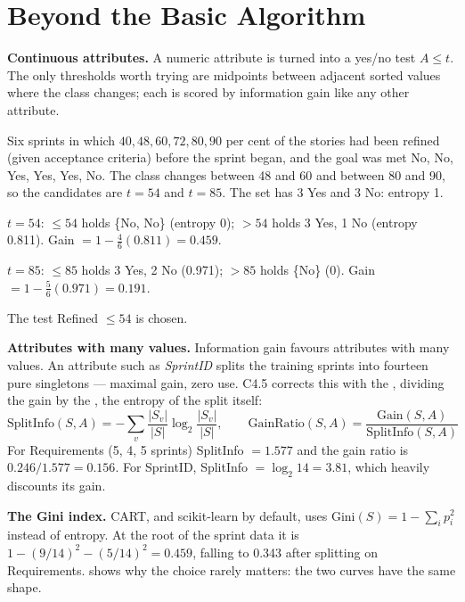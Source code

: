 \section{Beyond the Basic Algorithm}

\textbf{Continuous attributes.} A numeric attribute is turned into a yes/no test
$A \le t$. The only thresholds worth trying are midpoints between adjacent sorted
values where the class changes; each is scored by information gain like any
other attribute.

\begin{worked}
Six sprints in which $40, 48, 60, 72, 80, 90$ per cent of the stories had been
refined (given acceptance criteria) before the sprint began, and the goal was met
No, No, Yes, Yes, Yes, No. The class changes between 48 and 60 and between 80 and
90, so the candidates are $t = 54$ and $t = 85$. The set has 3 Yes and 3 No:
entropy 1.
\begin{tight}
  \item $t = 54$: $\le 54$ holds \{No, No\} (entropy 0); $> 54$ holds 3 Yes, 1 No
        (entropy 0.811). Gain $= 1 - \tfrac{4}{6}(0.811) = \mathbf{0.459}$.
  \item $t = 85$: $\le 85$ holds 3 Yes, 2 No (0.971); $> 85$ holds \{No\} (0).
        Gain $= 1 - \tfrac{5}{6}(0.971) = \mathbf{0.191}$.
\end{tight}
The test Refined $\le 54$ is chosen.
\end{worked}

\textbf{Attributes with many values.} Information gain favours attributes with
many values. An attribute such as \emph{SprintID} splits the training sprints into
fourteen pure singletons --- maximal gain, zero use. C4.5 corrects this with the
, dividing the gain by the , the entropy
of the split itself:
\[
\text{SplitInfo}(S, A) = -\sum_{v} \frac{|S_v|}{|S|}\log_2 \frac{|S_v|}{|S|},
\qquad
\text{GainRatio}(S, A) = \frac{\text{Gain}(S, A)}{\text{SplitInfo}(S, A)}
\]
For Requirements (5, 4, 5 sprints) SplitInfo $= 1.577$ and the gain ratio is
$0.246/1.577 = 0.156$. For SprintID, SplitInfo $= \log_2 14 = 3.81$, which heavily
discounts its gain.

\textbf{The Gini index.} CART, and scikit-learn by default, uses
$\text{Gini}(S) = 1 - \sum_i p_i^2$ instead of entropy. At the root of the sprint
data it is $1 - (9/14)^2 - (5/14)^2 = 0.459$, falling to 0.343 after splitting on
Requirements.  shows why the choice rarely matters: the two
curves have the same shape.

